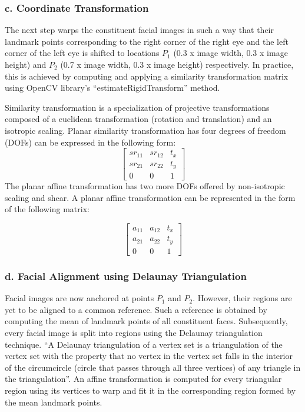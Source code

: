 \documentclass[../report.tex]{subfiles}
\begin{document}
    \subsubsection{c. Coordinate Transformation}
    The next step warps the constituent facial images in such a way that their landmark points corresponding to the right corner of the right eye and the left corner of the left eye is shifted to locations $P_{1}$ (0.3 x image width, 0.3 x image height) and $P_{2}$ (0.7 x image width, 0.3 x image height) respectively. In practice, this is achieved by computing and applying a similarity transformation matrix using OpenCV library's \enquote{estimateRigidTransform} method.
    
    Similarity transformation \cite{hartley2003multiple} is a specialization of projective transformations composed of a euclidean transformation (rotation and translation) and an isotropic scaling. Planar similarity transformation has four degrees of freedom (DOFs) can be expressed in the following form:
    \begin{equation*}
    \begin{bmatrix}
    	sr_{11} & sr_{12} & t_{x} \\
    	sr_{21} & sr_{22} & t_{y} \\
    	0 & 0 & 1 
    \end{bmatrix} 
\end{equation*}
   The planar affine transformation has two more DOFs offered by non-isotropic scaling and shear. A planar affine transformation can be represented in the form of the following matrix:
    
    \begin{equation*}
    \begin{bmatrix}
    	a_{11} & a_{12} & t_{x} \\
    	a_{21} & a_{22} & t_{y} \\
    	0 & 0 & 1 
    \end{bmatrix}  
\end{equation*}
    \subsubsection{d. Facial Alignment using Delaunay Triangulation}
    Facial images are now anchored at points $P_{1}$ and $P_{2}$. However, their regions are yet to be aligned to a common reference. Such a reference is obtained by computing the mean of landmark points of all constituent faces. Subsequently, every facial image is split into regions using the Delaunay triangulation technique. \enquote{A Delaunay triangulation of a vertex set is a triangulation of the vertex set with the property that no vertex in the vertex set falls in the interior of the circumcircle (circle that passes through all three vertices) of any triangle in the triangulation}\cite{cmu_triangle:_nodate}. An affine transformation is computed for every triangular region using its vertices to warp and fit it in the corresponding region formed by the mean landmark points.
    
\end{document}
